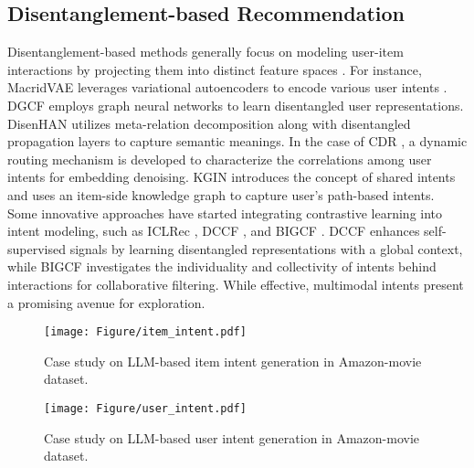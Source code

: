 \subsection{Disentanglement-based Recommendation}
Disentanglement-based methods generally focus on modeling user-item interactions by projecting them into distinct feature spaces \citep{2019MEIRec, 2018VAECF}. For instance, MacridVAE \citep{2019MacridVAE} leverages variational autoencoders to encode various user intents \citep{2019DGNN}. DGCF \citep{2020DGCF} employs graph neural networks to learn disentangled user representations. DisenHAN \citep{2020disenhan} utilizes meta-relation decomposition along with disentangled propagation layers to capture semantic meanings. In the case of CDR \citep{2021CDR}, a dynamic routing mechanism is developed to characterize the correlations among user intents for embedding denoising. KGIN \citep{2021kgin} introduces the concept of shared intents and uses an item-side knowledge graph to capture user’s path-based intents. Some innovative approaches have started integrating contrastive learning into intent modeling, such as ICLRec \citep{2022ICLRec}, DCCF \citep{2023dccf}, and BIGCF \citep{2024bigcf}. DCCF \citep{2023dccf} enhances self-supervised signals by learning disentangled representations with a global context, while BIGCF investigates the individuality and collectivity of intents behind interactions for collaborative filtering. While effective, multimodal intents present a promising avenue for exploration.

\begin{figure}[h!tp]
    \centering
    \texttt{[image: Figure/item\_intent.pdf]}
    \caption{Case study on LLM-based item intent generation in Amazon-movie dataset.}
    \label{fig:item_intent}
\end{figure}

\begin{figure}[h!tp]
    \centering
    \texttt{[image: Figure/user\_intent.pdf]}
    \caption{Case study on LLM-based user intent generation in Amazon-movie dataset.} 
    \label{fig:user_intent}
\end{figure}